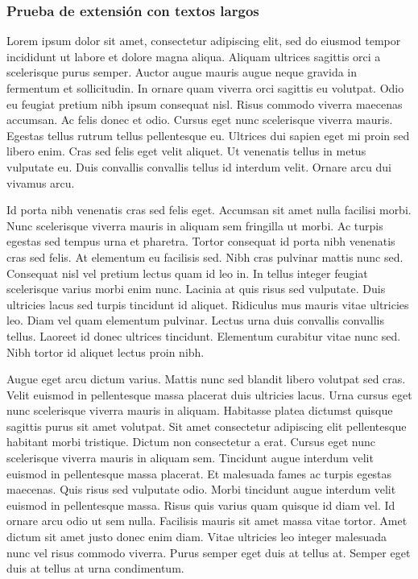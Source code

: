 \subsubsection{Prueba de extensión con textos largos}

Lorem ipsum dolor sit amet, consectetur adipiscing elit, sed do eiusmod tempor incididunt ut labore et dolore magna aliqua. Aliquam ultrices sagittis orci a scelerisque purus semper. Auctor augue mauris augue neque gravida in fermentum et sollicitudin. In ornare quam viverra orci sagittis eu volutpat. Odio eu feugiat pretium nibh ipsum consequat nisl. Risus commodo viverra maecenas accumsan. Ac felis donec et odio. Cursus eget nunc scelerisque viverra mauris. Egestas tellus rutrum tellus pellentesque eu. Ultrices dui sapien eget mi proin sed libero enim. Cras sed felis eget velit aliquet. Ut venenatis tellus in metus vulputate eu. Duis convallis convallis tellus id interdum velit. Ornare arcu dui vivamus arcu.

Id porta nibh venenatis cras sed felis eget. Accumsan sit amet nulla facilisi morbi. Nunc scelerisque viverra mauris in aliquam sem fringilla ut morbi. Ac turpis egestas sed tempus urna et pharetra. Tortor consequat id porta nibh venenatis cras sed felis. At elementum eu facilisis sed. Nibh cras pulvinar mattis nunc sed. Consequat nisl vel pretium lectus quam id leo in. In tellus integer feugiat scelerisque varius morbi enim nunc. Lacinia at quis risus sed vulputate. Duis ultricies lacus sed turpis tincidunt id aliquet. Ridiculus mus mauris vitae ultricies leo. Diam vel quam elementum pulvinar. Lectus urna duis convallis convallis tellus. Laoreet id donec ultrices tincidunt. Elementum curabitur vitae nunc sed. Nibh tortor id aliquet lectus proin nibh.

Augue eget arcu dictum varius. Mattis nunc sed blandit libero volutpat sed cras. Velit euismod in pellentesque massa placerat duis ultricies lacus. Urna cursus eget nunc scelerisque viverra mauris in aliquam. Habitasse platea dictumst quisque sagittis purus sit amet volutpat. Sit amet consectetur adipiscing elit pellentesque habitant morbi tristique. Dictum non consectetur a erat. Cursus eget nunc scelerisque viverra mauris in aliquam sem. Tincidunt augue interdum velit euismod in pellentesque massa placerat. Et malesuada fames ac turpis egestas maecenas. Quis risus sed vulputate odio. Morbi tincidunt augue interdum velit euismod in pellentesque massa. Risus quis varius quam quisque id diam vel. Id ornare arcu odio ut sem nulla. Facilisis mauris sit amet massa vitae tortor. Amet dictum sit amet justo donec enim diam. Vitae ultricies leo integer malesuada nunc vel risus commodo viverra. Purus semper eget duis at tellus at. Semper eget duis at tellus at urna condimentum.

